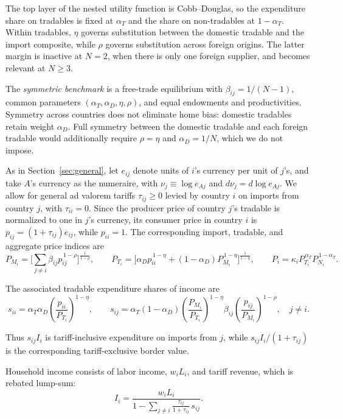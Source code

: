 \documentclass[11pt]{article}
\begin{document}
The top layer of the nested utility function is Cobb--Douglas, so the expenditure share on tradables is fixed at $\alpha_T$ and the share on non-tradables at $1-\alpha_T$. Within tradables, $\eta$ governs substitution between the domestic tradable and the import composite, while $\rho$ governs substitution across foreign origins. The latter margin is inactive at $N=2$, when there is only one foreign supplier, and becomes relevant at $N\geq3$.

The \emph{symmetric benchmark} is a free-trade equilibrium with $\beta_{ij}=1/(N-1)$, common parameters $(\alpha_T,\alpha_D,\eta,\rho)$, and equal endowments and productivities. Symmetry across countries does not eliminate home bias: domestic tradables retain weight $\alpha_D$. Full symmetry between the domestic tradable and each foreign tradable would additionally require $\rho=\eta$ and $\alpha_D=1/N$, which we do not impose.

As in Section~\ref{sec:general}, let $e_{ij}$ denote units of $i$'s currency per unit of $j$'s, and take $A$'s currency as the numeraire, with $\nu_j\equiv\log e_{Aj}$ and $d\nu_j=d\log e_{Aj}$. We allow for general ad valorem tariffs $\tau_{ij}\geq0$ levied by country $i$ on imports from country $j$, with $\tau_{ii}=0$. Since the producer price of country $j$'s tradable is normalized to one in $j$'s currency, its consumer price in country $i$ is $p_{ij}=(1+\tau_{ij})e_{ij}$, while $p_{ii}=1$. The corresponding import, tradable, and aggregate price indices are
\begin{equation}
P_{M_i}=\Big[\textstyle\sum_{j\neq i}\beta_{ij}p_{ij}^{\,1-\rho}\Big]^{\frac{1}{1-\rho}}, \qquad
P_{T_i}=\Big[\alpha_Dp_{ii}^{\,1-\eta}+(1-\alpha_D)P_{M_i}^{\,1-\eta}\Big]^{\frac{1}{1-\eta}}, \qquad
P_i=\kappa_iP_{T_i}^{\,\alpha_T}P_{N_i}^{\,1-\alpha_T}.
\label{eq:indices}
\end{equation}

The associated tradable expenditure shares of income are
\begin{equation}
s_{ii}=\alpha_T\alpha_D\left(\frac{p_{ii}}{P_{T_i}}\right)^{1-\eta}, \qquad
s_{ij}=\alpha_T(1-\alpha_D)\left(\frac{P_{M_i}}{P_{T_i}}\right)^{1-\eta}\beta_{ij}
\left(\frac{p_{ij}}{P_{M_i}}\right)^{1-\rho}, \quad j\neq i.
\label{eq:sfor}
\end{equation}

Thus $s_{ij}I_i$ is tariff-inclusive expenditure on imports from $j$, while $s_{ij}I_i/(1+\tau_{ij})$ is the corresponding tariff-exclusive border value.

Household income consists of labor income, $w_iL_i$, and tariff revenue, which is rebated lump-sum:
\begin{equation}
I_i=\frac{w_iL_i}{1-\sum_{j\neq i}\frac{\tau_{ij}}{1+\tau_{ij}}\,s_{ij}}.
\label{eq:income}
\end{equation}
\end{document}
